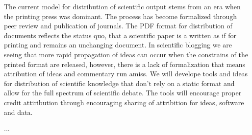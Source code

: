 \begin{workpackage}[id=social-aspects,wphases=12-24!.5,
  title=Social Aspects,
  UORM=1,USHRM=8]
\begin{tasklist}
\begin{task}[title=Modern Distribution of Scientific Output]
  The current model for distribution of scientific output stems from an era when the printing press was dominant. The process has become formalized through peer review and publication of journals. The PDF format for distribution of documents reflects the status quo, that a scientific paper is a written as if for printing and remains an unchanging document. In scientific blogging we are seeing that more rapid propagation of ideas can occur when the constrains of the printed format are released, however, there is a lack of formalization that means attribution of ideas and commentary run amiss. We will develope tools and ideas for distribution of scientific knowledge that don't rely on a static format and allow for the full spectrum of scientific debate. The tools will encourage proper credit attiribution through encouraging sharing of attribition for ideas, software and data.
\end{task}
\end{tasklist}


\begin{wpdelivs}
  \begin{wpdeliv}[due=12,id=social-...,dissem=??,nature=??]
      {...}
\end{wpdeliv}
\end{wpdelivs}
\end{workpackage}
